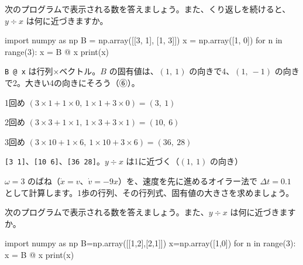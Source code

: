\begin{reidai}[プログラムを読む]
\noindent\begin{minipage}[c]{0.41\linewidth}\raggedright
次のプログラムで表示される数を答えましょう。また、くり返しを続けると、$y\div x$ は何に近づきますか。
\end{minipage}\hfill
\begin{minipage}[c]{0.56\linewidth}
\begin{bkcode}[Python]
import numpy as np
B = np.array([[3, 1], [1, 3]])
x = np.array([1, 0])
for n in range(3):
    x = B @ x
    print(x)
\end{bkcode}
\end{minipage}\par
\kangaekata \texttt{B @ x} は行列×ベクトル。$B$ の固有値は、$(1,\ 1)$ の向きで4、$(1,\ -1)$ の向きで2。大きい4の向きにそろう（⑥）。\par
\shiki 1回め $(3\times1+1\times0,\ 1\times1+3\times0)=(3,\ 1)$\par
\kviikq 2回め $(3\times3+1\times1,\ 1\times3+3\times1)=(10,\ 6)$\par
\kviikq 3回め $(3\times10+1\times6,\ 1\times10+3\times6)=(36,\ 28)$\par
\kotae \texttt{[3 1]}、\texttt{[10 6]}、\texttt{[36 28]}。$y\div x$ は1に近づく（$(1,\ 1)$ の向き）
\end{reidai}

\begingroup{}%
\noindent\begin{minipage}[t]{0.49\linewidth}
\begin{jibun}
\raggedright $\omega=3$ のばね（$\dot x=v$、$\dot v=-9x$）を、速度を先に進めるオイラー法で $\Delta t=0.1$ として計算します。1歩の行列、その行列式、固有値の大きさを求めましょう。
\end{jibun}
\end{minipage}\hfill
\begin{minipage}[t]{0.49\linewidth}
\begin{jibun}
\raggedright 次のプログラムで表示される数を答えましょう。また、$y\div x$ は何に近づきますか。\par\vspace{2pt}
\begin{bkcode}[Python]
import numpy as np
B=np.array([[1,2],[2,1]])
x=np.array([1,0])
for n in range(3):
    x = B @ x
    print(x)
\end{bkcode}
\end{jibun}
\end{minipage}\par
\endgroup

